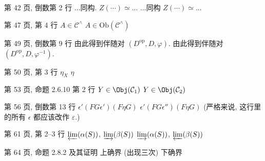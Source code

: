 \documentclass{AJerrata}
\begin{document}
\begin{Errata}
		\item[第 42 页, 倒数第 2 行]
		\Orig ...同构. $Z(\cdots) \simeq $...
		\Corr ...同构 $Z(\cdots) \simeq$...
		
        \item[第 47 页, 第 4 行]
        \Orig $A \in \mathcal{C}^\wedge$
        \Corr $A \in \mathrm{Ob}(\mathcal{C}^\wedge)$

		\item[第 49 页, 倒数第 9 行]
		\Orig 由此得到伴随对 $(D^{\mathrm{op}}, D, \varphi)$.
		\Corr 由此得到伴随对 $(D^{\mathrm{op}}, D, \varphi^{-1})$.

        \item[第 50 页, 第 3 行]
        \Orig $\eta_X$
        \Corr $\eta$
	
		\item[第 53 页, 命题 2.6.10 第 2 行]
		\Orig $Y \in \Obj(\mathcal{C}_1)$
		\Corr $Y \in \Obj(\mathcal{C}_2)$


		\item[第 56 页, 倒数第 13 行]
		\Orig $\epsilon' (FG \epsilon')(F\eta G)$
		\Corr $\epsilon' (FG \epsilon'')(F\eta G)$ \quad (严格来说, 这行里的所有 $\epsilon$ 都应该改作 $\varepsilon$.)

		\item[第 61 页, 第 2--3 行]
		\Orig $\varprojlim (\alpha(S))$, $\varinjlim (\beta(S))$
		\Corr $\varinjlim (\alpha(S))$, $\varprojlim (\beta(S))$
		
		\item[第 64 页, 命题 2.8.2 及其证明]
		\Orig 上确界 (出现三次)
		\Corr 下确界
		

\end{Errata}
\end{document}
